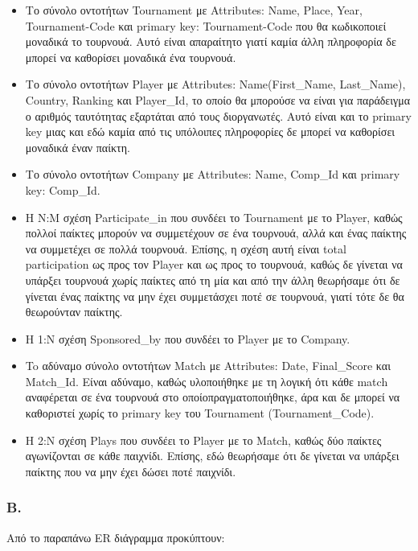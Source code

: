 \documentclass[a4paper]{article}
\begin{document}
\begin{itemize}
	\item Το σύνολο οντοτήτων Tournament με Attributes: Name, Place, Year, Tournament-Code και primary key: Tournament-Code που θα κωδικοποιεί μοναδικά το τουρνουά. Αυτό είναι απαραίτητο γιατί καμία άλλη πληροφορία δε μπορεί να καθορίσει μοναδικά ένα τουρνουά.
	\item Το σύνολο οντοτήτων Player με Attributes: Name(First\_Name, Last\_Name), Country, Ranking και Player\_Id, το οποίο θα μπορούσε να είναι για παράδειγμα ο αριθμός ταυτότητας εξαρτάται από τους διοργανωτές. Αυτό είναι και το primary key μιας και εδώ καμία από τις υπόλοιπες πληροφορίες δε μπορεί να καθορίσει μοναδικά έναν παίκτη.
	\item Το σύνολο οντοτήτων Company με Attributes: Name, Comp\_Id και primary key: Comp\_Id.
	\item Η N:M σχέση Participate\_in που συνδέει το Tournament με το Player, καθώς πολλοί παίκτες μπορούν να συμμετέχουν σε ένα τουρνουά, αλλά και ένας παίκτης να συμμετέχει σε πολλά τουρνουά. Επίσης, η σχέση αυτή είναι total participation ως προς τον Player και ως προς το τουρνουά, καθώς δε γίνεται να υπάρξει τουρνουά χωρίς παίκτες από τη μία και από την άλλη θεωρήσαμε ότι δε γίνεται ένας παίκτης να μην έχει συμμετάσχει ποτέ σε τουρνουά, γιατί τότε δε θα θεωρούνταν παίκτης.
	\item Η 1:Ν σχέση Sponsored\_by που συνδέει το Player με το Company.
	\item To αδύναμο σύνολο οντοτήτων Match με Attributes: Date, Final\_Score και Match\_Id. Είναι αδύναμο, καθώς υλοποιήθηκε με τη λογική ότι κάθε match αναφέρεται σε ένα τουρνουά στο οποίοπραγματοποιήθηκε, άρα και δε μπορεί να καθοριστεί χωρίς το primary key του Tournament (Tournament\_Code). 
	\item H 2:Ν σχέση Plays που συνδέει το Player με το Match, καθώς δύο παίκτες αγωνίζονται σε κάθε παιχνίδι. Επίσης, εδώ θεωρήσαμε ότι δε γίνεται να υπάρξει παίκτης που να μην έχει δώσει ποτέ παιχνίδι. 
\end{itemize}

\subsubsection*{B.}

	Από το παραπάνω  ER διάγραμμα προκύπτουν:
	
\end{document}
